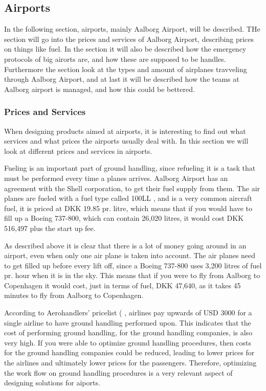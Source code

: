 \subsection{Airports}

In the following section, airports, mainly Aalborg Airport, will be described. THe section will go into the prices and services of Aalborg Airport, describing prices on things like fuel. In the section it will also be described how the emergency protocols of big airorts are, and how these are supposed to be handles. Furthermore the section look at the types and amount of airplanes travveling through Aalborg Airport, and at last it will be described how the teams at Aalborg airport is managed, and how this could be bettered.

\subsubsection{Prices and Services}
When designing products aimed at airports, it is interesting to find out what services and what prices the airports usually deal with. In this section we will look at different prices and services in airports.


Fueling is an important part of ground handling, since refueling it is a task that must be performed every time a planes arrives. Aalborg Airport has an agreement with the Shell corporation, to get their fuel supply from them. The air planes are fueled with a fuel type called 100LL \cite{iaopa_fuelprices}, and is a very common aircraft fuel, it is priced at DKK 19.85 pr. litre, which means that if you would have to fill up a Boeing 737-800, which can contain 26,020 litres\cite{737_specs}, it would cost DKK 516,497 plus the start up fee.

As described above it is clear that there is a lot of money going around in an airport, even when only one air plane is taken into account. The air planes need to get filled up before every lift off, since a Boeing 737-800 uses 3,200 litres of fuel pr. hour when it is in the sky. This means that if you were to fly from Aalborg to Copenhagen it would cost, just in terms of fuel, DKK 47,640, as it takes 45 minutes to fly from Aalborg to Copenhagen.


According to Aerohandlers' pricelist (%
, airlines pay upwards of USD 3000 for a single airline to have ground handling performed upon. This indicates that the cost of performing ground handling, for the ground handling companies, is also very high. If you were able to optimize ground handling procedures, then costs for the ground handling companies could be reduced, leading to lower prices for the airlines and ultimately lower prices for the passengers. Therefore, optimizing the work flow on ground handling procedures is a very relevant aspect of designing solutions for aiports.